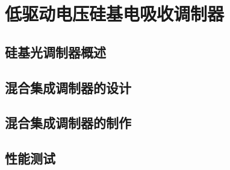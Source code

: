 \chapter{低驱动电压硅基电吸收调制器}
\section{硅基光调制器概述}
\section{混合集成调制器的设计}
\section{混合集成调制器的制作}
\section{性能测试}
